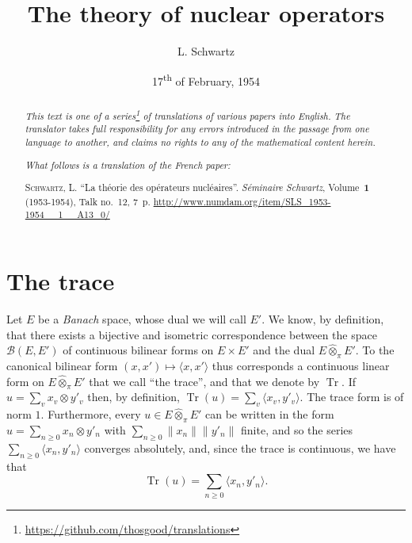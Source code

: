 \documentclass{article}
\title{The theory of nuclear operators}
\author{L. Schwartz}
\date{17\textsuperscript{th} of February, 1954}
\theoremstyle{plain}
\theoremstyle{definition}
\newcommand{\BB}{\mathcal{B}}
\newcommand{\cprojotimes}{\widehat{\otimes}_\pi}
\newcommand{\tr}{\operatorname{Tr}}
\renewcommand{\geq}{\geqslant}
\newcommand{\oldpage}[1]{\marginpar{\footnotesize$\Big\vert$ \textit{p.~#1}}}
\begin{document}
\maketitle
\thispagestyle{fancy}

\renewcommand{\abstractname}{Translator's note.}

\begin{abstract}
  \renewcommand*{\thefootnote}{\fnsymbol{footnote}}
  \emph{This text is one of a series\footnote{\url{https://github.com/thosgood/translations}} of translations of various papers into English.}
  \emph{The translator takes full responsibility for any errors introduced in the passage from one language to another, and claims no rights to any of the mathematical content herein.}
  
  \emph{What follows is a translation of the French paper:}

  \medskip\noindent
  \textsc{Schwartz, L.}
  ``La th\'{e}orie des op\'{e}rateurs nucl\'{e}aires''.
  \emph{S\'{e}minaire Schwartz}, Volume~\textbf{1} (1953-1954), Talk no.~12, 7~p.
  {\footnotesize\url{http://www.numdam.org/item/SLS_1953-1954__1__A13_0/}}
\end{abstract}

\setcounter{footnote}{0}

\tableofcontents
\bigskip



\section{The trace}
\label{section1}

\oldpage{1}

Let $E$ be a \emph{Banach} space, whose dual we will call $E'$.
We know, by definition, that there exists a bijective and isometric correspondence between the space $\BB(E,E')$ of continuous bilinear forms on $E\times E'$ and the dual $E\cprojotimes E'$.
To the canonical bilinear form $(x,x')\mapsto\langle x,x'\rangle$ thus corresponds a continuous linear form on $E\cprojotimes E'$ that we call ``the trace'', and that we denote by $\tr$.
If $u=\sum_v x_v\otimes y'_v$ then, by definition, $\tr(u)=\sum_v\langle x_v,y'_v\rangle$.
The trace form is of norm $1$.
Furthermore, every $u\in E\cprojotimes E'$ can be written in the form $u=\sum_{n\geq0}x_n\otimes y'_n$ with $\sum_{n\geq0}\|x_n\|\|y'_n\|$ finite, and so the series $\sum_{n\geq0}\langle x_n,y'_n\rangle$ converges absolutely, and, since the trace is continuous, we have that
\[
  \tr(u) = \sum_{n\geq0} \langle x_n, y'_n \rangle.
\]
\end{document}
